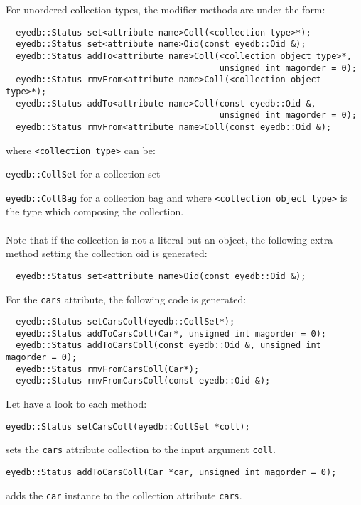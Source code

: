 For unordered collection types, the modifier methods are under the form:
\verbsize
\begin{verbatim}
  eyedb::Status set<attribute name>Coll(<collection type>*);
  eyedb::Status set<attribute name>Oid(const eyedb::Oid &);
  eyedb::Status addTo<attribute name>Coll(<collection object type>*,
                                          unsigned int magorder = 0);
  eyedb::Status rmvFrom<attribute name>Coll(<collection object type>*);
  eyedb::Status addTo<attribute name>Coll(const eyedb::Oid &,
                                          unsigned int magorder = 0);
  eyedb::Status rmvFrom<attribute name>Coll(const eyedb::Oid &);
\end{verbatim}
\normalsize
where \texttt{<collection type>} can be:
\be
\item \texttt{eyedb::CollSet} for a collection set
\item \texttt{eyedb::CollBag} for a collection bag
\ee
and where \texttt{<collection object type>} is the type which composing
the collection.
\\
\\
Note that if the collection is not a literal but an object, the following
extra method setting the collection oid is generated:
\verbsize
\begin{verbatim}
  eyedb::Status set<attribute name>Oid(const eyedb::Oid &);
\end{verbatim}
\normalsize
For the \texttt{cars} attribute, the following code is generated:
\verbsize
\begin{verbatim}
  eyedb::Status setCarsColl(eyedb::CollSet*);
  eyedb::Status addToCarsColl(Car*, unsigned int magorder = 0);
  eyedb::Status addToCarsColl(const eyedb::Oid &, unsigned int magorder = 0);
  eyedb::Status rmvFromCarsColl(Car*);
  eyedb::Status rmvFromCarsColl(const eyedb::Oid &);
\end{verbatim}
\normalsize
Let have a look to each method:
\be
\item
\verbsize
\begin{verbatim}
eyedb::Status setCarsColl(eyedb::CollSet *coll);
\end{verbatim}
\normalsize
sets the \texttt{cars} attribute collection to the input argument
\texttt{coll}.
\item
\verbsize
\begin{verbatim}
eyedb::Status addToCarsColl(Car *car, unsigned int magorder = 0);
\end{verbatim}
\normalsize
adds the \texttt{car} instance to the collection attribute \texttt{cars}.
